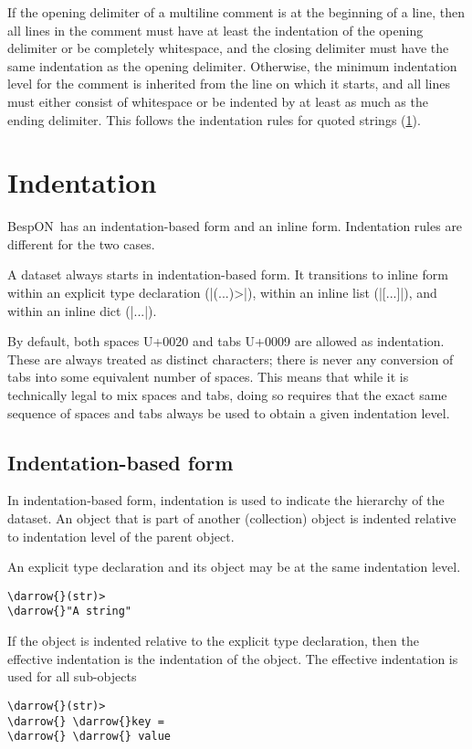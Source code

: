 \documentclass[11pt]{article}
\newcommand{\bespon}{BespON}
\newcommand{\darrow}{\ensuremath{\textcolor{DarkGreen}{\downarrow}}}
\begin{document}
If the opening delimiter of a multiline comment is at the beginning of a line, then all lines in the comment must have at least the indentation of the opening delimiter or be completely whitespace, and the closing delimiter must have the same indentation as the opening delimiter.  Otherwise, the minimum indentation level for the comment is inherited from the line on which it starts, and all lines must either consist of whitespace or be indented by at least as much as the ending delimiter. This follows the indentation rules for quoted strings (\cref{sec:indentation}).




\section{Indentation}
\label{sec:indentation}

\bespon\ has an indentation-based form and an inline form.  Indentation rules are different for the two cases.

A dataset always starts in indentation-based form.  It transitions to inline form within an explicit type declaration (|(...)>|), within an inline list (|[...]|), and within an inline dict (|{...}|).

By default, both spaces U+0020 and tabs U+0009 are allowed as indentation.  These are always treated as distinct characters; there is never any conversion of tabs into some equivalent number of spaces.  This means that while it is technically legal to mix spaces and tabs, doing so requires that the exact same sequence of spaces and tabs always be used to obtain a given indentation level.


\subsection{Indentation-based form}

In indentation-based form, indentation is used to indicate the hierarchy of the dataset.  An object that is part of another (collection) object is indented relative to indentation level of the parent object.

An explicit type declaration and its object may be at the same indentation level.
\begin{Verbatim}[commandchars=\\\{\}]
\darrow{}(str)>
\darrow{}"A string"
\end{Verbatim}
If the object is indented relative to the explicit type declaration, then the effective indentation is the indentation of the object.  The effective indentation is used for all sub-objects
\begin{Verbatim}[commandchars=\\\{\}]
\darrow{}(str)>
\darrow{} \darrow{}key = 
\darrow{} \darrow{} value
\end{Verbatim}
\end{document}
